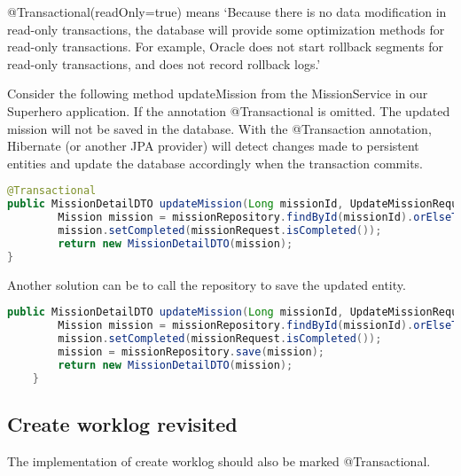 @Transactional(readOnly=true) means `Because there is no data modification in read-only transactions, the database will provide some optimization methods for read-only transactions. For example, Oracle does not start rollback segments for read-only transactions, and does not record rollback logs.'

Consider the following method updateMission from the MissionService in our Superhero application. If the annotation @Transactional is omitted. The updated mission will not be saved in the database.  With the @Transaction annotation,  Hibernate (or another JPA provider) will detect changes made to persistent entities and update the database accordingly when the transaction commits.

\begin{lstlisting}[frame=single, language=java]
@Transactional
public MissionDetailDTO updateMission(Long missionId, UpdateMissionRequest missionRequest) {
		Mission mission = missionRepository.findById(missionId).orElseThrow(() -> new ResourceNotFoundException("Mission", "ID", missionId));
		mission.setCompleted(missionRequest.isCompleted());
		return new MissionDetailDTO(mission);
}
\end{lstlisting}

Another solution can be to call the repository to save the updated entity.

\begin{lstlisting}[frame=single, language=java]
public MissionDetailDTO updateMission(Long missionId, UpdateMissionRequest missionRequest) {
		Mission mission = missionRepository.findById(missionId).orElseThrow(() -> new ResourceNotFoundException("Mission", "ID", missionId));
		mission.setCompleted(missionRequest.isCompleted());
		mission = missionRepository.save(mission);
		return new MissionDetailDTO(mission);
	}
\end{lstlisting}

\subsection{Create worklog revisited}

The implementation of create worklog should also be marked @Transactional.

